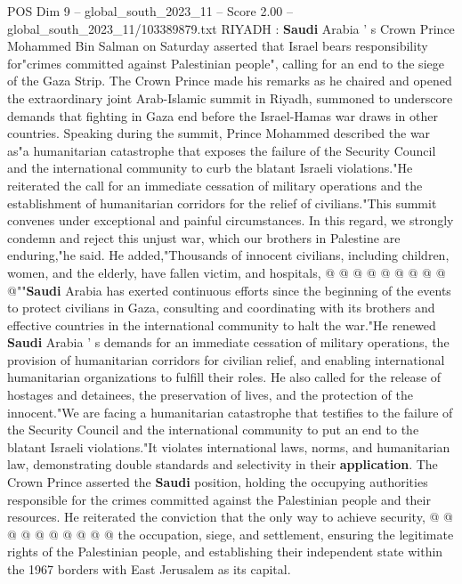 \begin{textsample}{POS Dim 9 – global\_south\_2023\_11 – Score 2.00 – global\_south\_2023\_11/103389879.txt}  \label{ex:f9_pos_132}
RIYADH : \textbf{Saudi} Arabia ' s Crown Prince Mohammed Bin Salman on Saturday asserted that Israel bears responsibility for"crimes committed against Palestinian people", calling for an end to the siege of the Gaza Strip.
The Crown Prince made his remarks as he chaired and opened the extraordinary joint Arab-Islamic summit in Riyadh, summoned to underscore demands that fighting in Gaza end before the Israel-Hamas war draws in other countries.
Speaking during the summit, Prince Mohammed described the war as"a humanitarian catastrophe that exposes the failure of the Security Council and the international community to curb the blatant Israeli violations."He reiterated the call for an immediate cessation of military operations and the establishment of humanitarian corridors for the relief of civilians."This summit convenes under exceptional and painful circumstances.
In this regard, we strongly condemn and reject this unjust war, which our brothers in Palestine are enduring,"he said.
He added,"Thousands of innocent civilians, including children, women, and the elderly, have fallen victim, and hospitals, @ @ @ @ @ @ @ @ @ @""\textbf{Saudi} Arabia has exerted continuous efforts since the beginning of the events to protect civilians in Gaza, consulting and coordinating with its brothers and effective countries in the international community to halt the war."He renewed \textbf{Saudi} Arabia ' s demands for an immediate cessation of military operations, the provision of humanitarian corridors for civilian relief, and enabling international humanitarian organizations to fulfill their roles.
He also called for the release of hostages and detainees, the preservation of lives, and the protection of the innocent."We are facing a humanitarian catastrophe that testifies to the failure of the Security Council and the international community to put an end to the blatant Israeli violations."It violates international laws, norms, and humanitarian law, demonstrating double standards and selectivity in their \textbf{application}.
The Crown Prince asserted the \textbf{Saudi} position, holding the occupying authorities responsible for the crimes committed against the Palestinian people and their resources.
He reiterated the conviction that the only way to achieve security, @ @ @ @ @ @ @ @ @ @ the occupation, siege, and settlement, ensuring the legitimate rights of the Palestinian people, and establishing their independent state within the 1967 borders with East Jerusalem as its capital.

\end{textsample}
